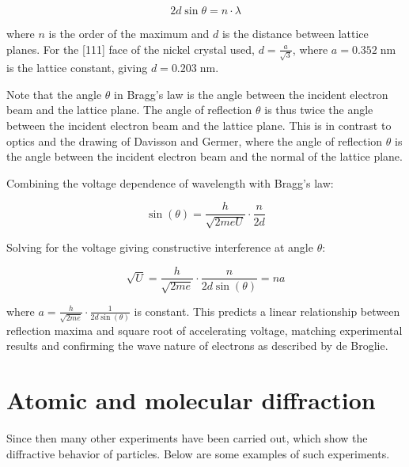 \documentclass[
  a4paper,
]{book}
\begin{document}
\[
2d\sin \theta = n \cdot \lambda \tag{Bragg's law}
\]

where \(n\) is the order of the maximum and \(d\) is the distance
between lattice planes. For the {[}111{]} face of the nickel crystal
used, \(d = \frac{a}{\sqrt{3}}\), where \(a = 0.352 \;\mathrm{nm}\) is
the lattice constant, giving \(d = 0.203 \;\mathrm{nm}\).

\begin{tcolorbox}[enhanced jigsaw, coltitle=black, title=\textcolor{quarto-callout-tip-color}{\faLightbulb}\hspace{0.5em}{Angle in Bragg's law}, colframe=quarto-callout-tip-color-frame, toprule=.15mm, opacitybacktitle=0.6, left=2mm, opacityback=0, breakable, toptitle=1mm, bottomtitle=1mm, leftrule=.75mm, arc=.35mm, titlerule=0mm, colbacktitle=quarto-callout-tip-color!10!white, rightrule=.15mm, bottomrule=.15mm, colback=white]

Note that the angle \(\theta\) in Bragg's law is the angle between the
incident electron beam and the lattice plane. The angle of reflection
\(\theta\) is thus twice the angle between the incident electron beam
and the lattice plane. This is in contrast to optics and the drawing of
Davisson and Germer, where the angle of reflection \(\theta\) is the
angle between the incident electron beam and the normal of the lattice
plane.

\end{tcolorbox}

Combining the voltage dependence of wavelength with Bragg's law:

\[
\sin(\theta) = \frac{h}{\sqrt{2 m e U}} \cdot \frac{n}{2 d}
\]

Solving for the voltage giving constructive interference at angle
\(\theta\):

\[
\sqrt{U} = \frac{h}{\sqrt{2 m e}} \cdot \frac{n}{2 d \sin(\theta)} = n a
\]

where \(a= \frac{h}{\sqrt{2 m e}} \cdot \frac{1}{2 d \sin(\theta)}\) is
constant. This predicts a linear relationship between reflection maxima
and square root of accelerating voltage, matching experimental results
and confirming the wave nature of electrons as described by de Broglie.

\section{Atomic and molecular
diffraction}\label{atomic-and-molecular-diffraction}

Since then many other experiments have been carried out, which show the
diffractive behavior of particles. Below are some examples of such
experiments.
\end{document}
